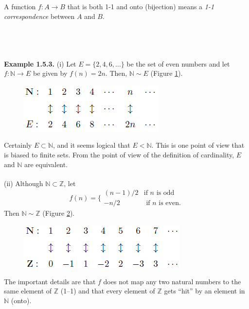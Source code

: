\documentclass{article}
\begin{document}
        A function $f:A \to B$ that is both 1-1 and onto (bijection) means a \textit{1-1 correspondence} between $A$ and $B$. 
        \\ \\
        \\ \\ \\
        \textbf{Example 1.5.3.} (i) Let $E = \{2,4,6,\dots\}$ be the set of even numbers and let $f:\mathbb{N} \to E$ be given by $f(n)=2n$. Then, $\mathbb{N} \sim E$ (Figure \ref{exp1.5.3(i)}).
        \begin{figure}[ht!]
            \centering
            \includegraphics[width=0.4\linewidth]{figs/example1.5.3(i).png}
            \caption{}
            \label{exp1.5.3(i)}
        \end{figure}
        Certainly $E \subset \mathbb{N}$, and it seems logical that $E < \mathbb{N}$. This is one point of view that is biased to finite sets. From the point of view of the definition of cardinality, $E$ and $\mathbb{N}$ are equivalent.\\ \\
        (ii) Although $\mathbb{N} \subset \mathbb{Z}$, let
        \begin{equation*}
            f(n) = \bigg\{ \begin{matrix} (n-1)/2 & \text{if $n$ is odd} \\ -n/2 & \text{ if $n$ is even.}\end{matrix}
        \end{equation*}
        Then $\mathbb{N} \sim \mathbb{Z}$ (Figure \ref{exp1.5.3(ii)}).
        \begin{figure}[ht!]
            \centering
            \includegraphics[width=0.45\linewidth]{figs/example1.5.3(ii).png}
            \caption{}
            \label{exp1.5.3(ii)}
        \end{figure}
        The important details are that $f$ does not map any two natural numbers to the same element of $\mathbb{Z}$ (1–1) and that every element of $\mathbb{Z}$ gets “hit” by an element in $\mathbb{N}$ (onto).\\ \\
\end{document}
